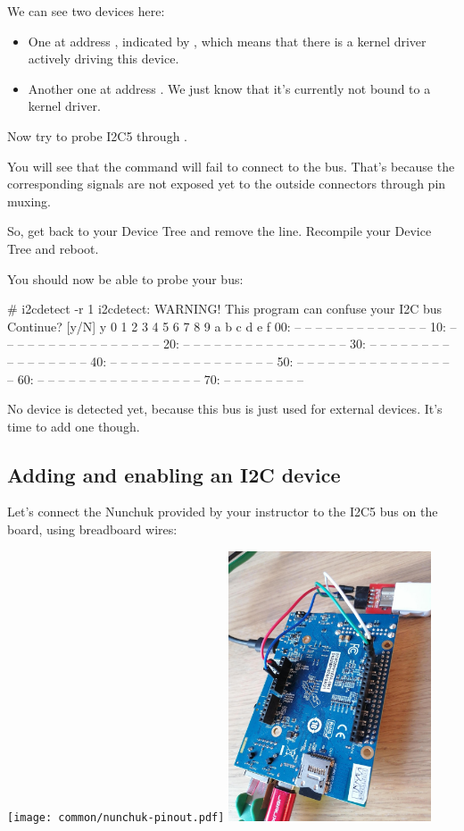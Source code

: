 We can see two devices here:
\begin{itemize}
\item One at address , indicated by ,
      which means that there is a kernel driver actively
      driving this device.
\item Another one at address . We just know that
      it's currently not bound to a kernel driver.
\end{itemize}

Now try to probe I2C5 through .

You will see that the command will fail to connect to
the bus. That's because the corresponding signals are
not exposed yet to the outside connectors through pin muxing.

So, get back to your Device Tree and remove the 
line. Recompile your Device Tree and reboot.

You should now be able to probe your bus:

\begin{bashinput}
# i2cdetect -r 1
i2cdetect: WARNING! This program can confuse your I2C bus
Continue? [y/N] y
     0  1  2  3  4  5  6  7  8  9  a  b  c  d  e  f
00:          -- -- -- -- -- -- -- -- -- -- -- -- --
10: -- -- -- -- -- -- -- -- -- -- -- -- -- -- -- --
20: -- -- -- -- -- -- -- -- -- -- -- -- -- -- -- --
30: -- -- -- -- -- -- -- -- -- -- -- -- -- -- -- --
40: -- -- -- -- -- -- -- -- -- -- -- -- -- -- -- --
50: -- -- -- -- -- -- -- -- -- -- -- -- -- -- -- --
60: -- -- -- -- -- -- -- -- -- -- -- -- -- -- -- --
70: -- -- -- -- -- -- -- --
\end{bashinput}

No device is detected yet, because this bus is just
used for external devices. It's time to add one though.

\subsection{Adding and enabling an I2C device}

Let's connect the Nunchuk provided by your instructor
to the I2C5 bus on the board, using breadboard wires:

\texttt{[image: common/nunchuk-pinout.pdf]}
\includegraphics[width=6cm]{labs/sysdev-accessing-hardware/dk1-board-nunchuk-connected.jpg}

